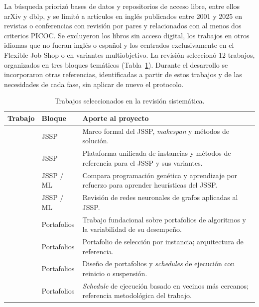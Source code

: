 La búsqueda priorizó bases de datos y repositorios de acceso libre, entre
ellos arXiv y dblp, y se limitó a artículos en inglés publicados entre 2001 y 2025 en revistas o conferencias
con revisión por pares y relacionados con al menos dos criterios PICOC. Se
excluyeron los libros sin acceso digital, los trabajos en otros idiomas que no
fueran inglés o español y los centrados exclusivamente en el Flexible Job Shop
o en variantes multiobjetivo. La revisión seleccionó 12 trabajos, organizados
en tres bloques temáticos (Tabla~\ref{tab:slr}). Durante el desarrollo se
incorporaron otras referencias, identificadas a partir de estos trabajos y de
las necesidades de cada fase, sin aplicar de nuevo el protocolo.

\begin{table}[H]
  \centering
  \small
  \singlespacing
  \caption{Trabajos seleccionados en la revisión sistemática.}
  \label{tab:slr}
  \begin{tabularx}{\textwidth}{>{\raggedright\arraybackslash}p{}
                               >{\raggedright\arraybackslash}p{}
                               >{\raggedright\arraybackslash}X}
    \toprule
    \textbf{Trabajo} & \textbf{Bloque} & \textbf{Aporte al proyecto} \\
    \midrule
    \citet{pinedo2022} & JSSP & Marco formal del JSSP, \textit{makespan} y
      métodos de solución. \\
    \citet{reijnen2023} & JSSP & Plataforma unificada de instancias y métodos
      de referencia para el JSSP y sus variantes. \\
    \citet{xu2025learn} & JSSP / ML & Compara programación genética y
      aprendizaje por refuerzo para aprender heurísticas del JSSP. \\
    \citet{smit2024gnn} & JSSP / ML & Revisión de redes neuronales de grafos
      aplicadas al JSSP. \\
    \citet{gomes2001} & Portafolios & Trabajo fundacional sobre portafolios de
      algoritmos y la variabilidad de su desempeño. \\
    \citet{xu2008satzilla} & Portafolios & Portafolio de selección por
      instancia; arquitectura de referencia. \\
    \citet{streeter2008} & Portafolios & Diseño de portafolios y
      \textit{schedules} de ejecución con reinicio o suspensión. \\
    \citet{amadini2014sunny} & Portafolios & \textit{Schedule} de ejecución
      basado en vecinos más cercanos; referencia metodológica del trabajo. \\

\end{tabularx}
\end{table}
